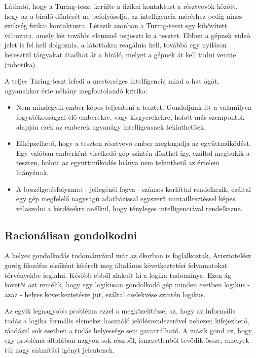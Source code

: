 Látható, hogy a Turing-teszt kerülte a fizikai kontaktust a résztvevők között, hogy az a bíráló döntését ne befolyásolja, az intelligencia méréshez pedig nincs szükség fizikai kontaktusra. Létezik azonban a Turing-teszt egy kibővített változata, amely két további elemmel terjeszti ki a tesztet. Ebben a gépnek videó jelet is fel kell dolgoznia, a látottakra reagálnia kell, továbbá egy nyíláson keresztül tárgyakat átadhat át a bíráló, melyet a gépnek át kell tudni vennie (robotika).\ujsor

A teljes Turing-teszt lefedi a mesterséges intelligencia mind a hat ágát, ugyanakkor érte néhány megfontolandó kritika: \cite{bibref:turing}
\begin{itemize}
	\item Nem mindegyik ember képes teljesíteni a tesztet. Gondoljunk itt a valamilyen fogyatékossággal élő emberekre, vagy kisgyerekekre, holott más szempontok alapján ezek az emberek ugyanúgy intelligensnek tekinthetőek.
	\item Elképzelhető, hogy a teszten résztvevő ember megtagadja az együttműködést. Egy valóban emberként viselkedő gép szintén dönthet így, ezáltal megbukik a teszten, holott az együttműködés hiánya nem tekinthető az értelem hiányának.
	\item A beszélgetésfolyamat - jellegénél fogva - számos korláttal rendelkezik, ezáltal egy gép megfelelő nagyságú adatbázissal egyszerű mintaillesztéssel képes válaszolni a kérdésekre anélkül, hogy tényleges intelligenciával rendelkezne. 
\end{itemize}

\subsection{Racionálisan gondolkodni} \label{subsection:racional_thinking}
A helyes gondolkodás tudományával már az ókorban is foglalkoztak, Arisztotelész görög filozófus elsőként kísérelt meg általános következtetési folyamatokat törvényekbe foglalni. Később ebből alakult ki a logika tudománya. Ezen ág követői azt remélik, hogy egy logikusan gondolkodó gép minden esetben logikus - azaz - helyes következtetésre jut, ezáltal cselekvése szintén logikus.\ujsor

Az egyik legnagyobb probléma ezzel a megközelítéssel az, hogy az informális tudás a logika formális elemeket használó jelölésrendszerével nehezen kifejezhető, ráadásul sok esetben a tudás helyessége sem garantálható. A másik gond az, hogy egy probléma általában nagyon sok részből, ismeretlenből tevődik össze, amelyek túl nagy számítási igényt jelentenek.

